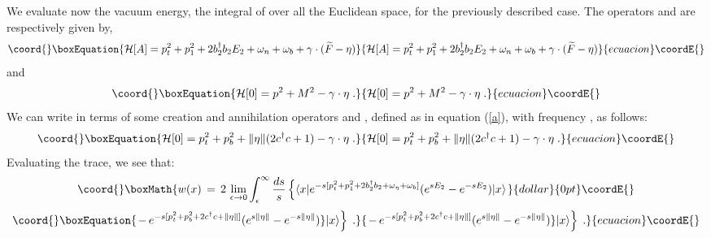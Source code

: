 \documentclass[a4paper,12pt]{article}
\providecommand{\Fd}{\widetilde{F}}
\providecommand{\n}{\eta}
\providecommand{\w}{\omega}
\begin{document}
We evaluate now the vacuum energy, the integral of \coordHE{} over all the
Euclidean space, for the previously described case. The operators
\coordHE{} and \coordHE{} are respectively given by,
\begin{equation}\coord{}\boxEquation{\label{HA}
{\mathcal H}[A]=p_t^2 + p_1^2 + 2b_2^\dagger b_2 E_2 + \w_n + \w_b +\gamma \cdot (\Fd-\n)
}{{\mathcal H}[A]=p_t^2 + p_1^2 + 2b_2^\dagger b_2 E_2 + \w_n + \w_b +\gamma \cdot (\Fd-\n)
}{ecuacion}\coordE{}\end{equation}
and
\begin{equation}\coord{}\boxEquation{\label{H0}
{\mathcal H}[0]= p^2 + M^2 - \gamma \cdot \n \;.
}{{\mathcal H}[0]= p^2 + M^2 - \gamma \cdot \n \;.
}{ecuacion}\coordE{}\end{equation}
We can write \coordHE{} in terms of some creation and
annihilation operators \coordHE{} and \coordHE{}, defined as in equation
(\ref{a}), with frequency \myHighlight{$\w=\|\n\|$}\coordHE{}, as follows:
\begin{equation}\coord{}\boxEquation{\label{H0c}
{\mathcal H}[0]= p_t^2 + p_b^2 + \|\n\|(2c^\dagger c+1) - \gamma \cdot\n \;.
}{{\mathcal H}[0]= p_t^2 + p_b^2 + \|\n\|(2c^\dagger c+1) - \gamma \cdot\n \;.
}{ecuacion}\coordE{}\end{equation}
Evaluating the trace, we see that:
$$\coord{}\boxMath{ w(x)\,=\, 2 \,\lim_{\epsilon \to 0} \int_\epsilon ^\infty\frac{ds}{s} \left\{ \langle x|e^{-s[p_t^2+p_1^2+2b_2^\dagger
b_2+\w_\n+\w_b]}(e^{sE_2}-e^{-sE_2}) |x\rangle \right.}{dollar}{0pt}\coordE{}$$ 
\begin{equation}\coord{}\boxEquation{\label{wtr1}
\left. -\, e^{-s[p_t^2+p_b^2+2c^\dagger c+\|\n\|]}(e^{s\|\n\|}-e^{-s\|\n\|})\}|x\rangle\right\} \;.
}{\left. -\, e^{-s[p_t^2+p_b^2+2c^\dagger c+\|\n\|]}(e^{s\|\n\|}-e^{-s\|\n\|})\}|x\rangle\right\} \;.
}{ecuacion}\coordE{}\end{equation}
\end{document}

